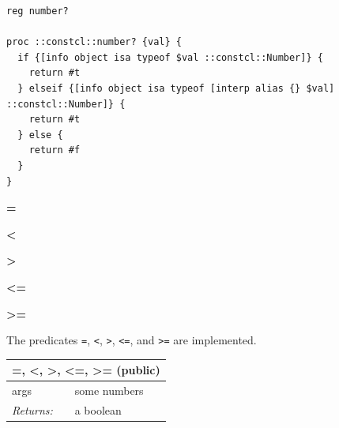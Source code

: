 \documentclass[twoside,9pt]{report}
\begin{document}
\noindent\makebox[\linewidth]{\rule{\linewidth}{0.4pt}}
\begin{lstlisting}
reg number?
 
proc ::constcl::number? {val} {
  if {[info object isa typeof $val ::constcl::Number]} {
    return #t
  } elseif {[info object isa typeof [interp alias {} $val] ::constcl::Number]} {
    return #t
  } else {
    return #f
  }
}
\end{lstlisting}
\noindent\makebox[\linewidth]{\rule{\linewidth}{0.4pt}}

\textbf{=}


\textbf{<}


\textbf{>}


\textbf{<=}


\textbf{>=}


The predicates \texttt{=}, \texttt{<}, \texttt{>}, \texttt{<=}, and \texttt{>=} are implemented.

\begin{tabular}{ |l l| }
\hline
\multicolumn{2}{|l|}{=, <, >, <=, >= (public)} \\
\hline
args & some numbers \\
\textit{Returns:} & a boolean \\
\hline
\end{tabular}
\end{document}
